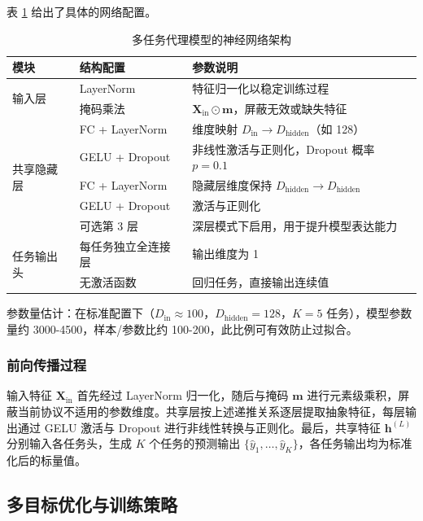 表 \ref{tab:nn_architecture} 给出了具体的网络配置。

\begin{table}[htbp]
	\centering
	\caption{多任务代理模型的神经网络架构}
	\label{tab:nn_architecture}
	\renewcommand{\arraystretch}{1.25}
	\begin{tabular}{lll}
		\toprule
		\textbf{模块} & \textbf{结构配置} & \textbf{参数说明} \\
		\midrule
		\multirow{2}{*}{输入层} 
		& LayerNorm 
		& 特征归一化以稳定训练过程 \\
		& 掩码乘法 
		& $\mathbf{X}_{\mathrm{in}} \odot \mathbf{m}$，屏蔽无效或缺失特征 \\
		\midrule
		\multirow{5}{*}{共享隐藏层} 
		& FC + LayerNorm 
		& 维度映射 $D_{\mathrm{in}} \rightarrow D_{\mathrm{hidden}}$（如 128） \\
		& GELU + Dropout 
		& 非线性激活与正则化，Dropout 概率 $p=0.1$ \\
		& FC + LayerNorm 
		& 隐藏层维度保持 $D_{\mathrm{hidden}} \rightarrow D_{\mathrm{hidden}}$ \\
		& GELU + Dropout 
		& 激活与正则化 \\
		& 可选第 3 层
		& 深层模式下启用，用于提升模型表达能力 \\
		\midrule
		\multirow{2}{*}{任务输出头} 
		& 每任务独立全连接层 
		& 输出维度为 1 \\
		& 无激活函数 
		& 回归任务，直接输出连续值 \\
		\bottomrule
	\end{tabular}
\end{table}


参数量估计：在标准配置下（$D_{\text{in}} \approx 100$，$D_{\text{hidden}}=128$，$K=5$ 任务），模型参数量约 3000-4500，样本/参数比约 100-200，此比例可有效防止过拟合。

\subsubsection{前向传播过程}

输入特征 $\mathbf{X}_{\text{in}}$ 首先经过 LayerNorm 归一化，随后与掩码 $\mathbf{m}$ 进行元素级乘积，屏蔽当前协议不适用的参数维度。共享层按上述递推关系逐层提取抽象特征，每层输出通过 GELU 激活与 Dropout 进行非线性转换与正则化。最后，共享特征 $\mathbf{h}^{(L)}$ 分别输入各任务头，生成 $K$ 个任务的预测输出 $\{\hat{y}_1, \ldots, \hat{y}_K\}$，各任务输出均为标准化后的标量值。

\subsection{多目标优化与训练策略}
\label{subsec:training}

